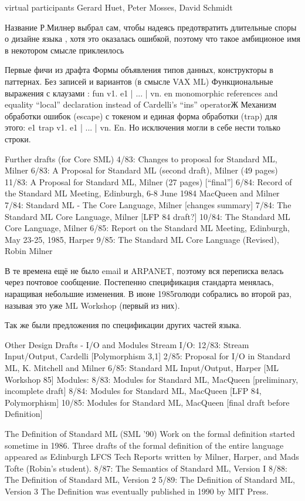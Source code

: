 \documentclass[14pt]{matmex-diploma-custom}
\begin{document}
virtual participants
Gerard Huet, Peter Mosses, David Schmidt

Название Р.Милнер выбрал сам, чтобы надеясь предотвратить длительные споры о дизайне языка , хотя это оказалась ошибкой, поэтому что такое амбиционое имя в некотором смысле приклеилось

Первые фичи из драфта
Формы объявления типов данных, конструкторы в паттернах.
Без записей и вариантов (в смысле VAX ML)
Функциональные выражения с клаузами :  fun v1. e1 | ... | vn. en
monomorphic references and equality
“local” declaration instead of Cardelli’s “ins” operatorЖ
Механизм обработки ошибок (escape) с токеном и единая форма обработки (trap) для этого:
e1 trap v1. e1 | ... | vn. En. Но исключения могли в себе нести только строки.


Further drafts (for Core SML)
4/83: Changes to proposal for Standard ML, Milner
6/83: A Proposal for Standard ML (second draft), Milner (49 pages)
11/83: A Proposal for Standard ML, Milner (27 pages) [“final”]
6/84: Record of the Standard ML Meeting, Edinburgh, 6-8 June 1984
MacQueen and Milner
7/84: Standard ML - The Core Language, Milner [changes summary]
7/84: The Standard ML Core Language, Milner [LFP 84 draft?]
10/84: The Standard ML Core Language, Milner
6/85: Report on the Standard ML Meeting, Edinburgh, May 23-25, 1985, Harper
9/85: The Standard ML Core Language (Revised), Robin Milner

В те времена ещё не было email и ARPANET, поэтому вся переписка велась через почтовое сообщение. Постепенно спецификация стандарта менялась, наращивая небольшие изменения. В июне 1985голюди собрались во второй раз, называя это уже ML Workshop (первый из них).

Так же были предложения по спецификации  других частей языка.

Other Design Drafts - I/O and Modules
Stream I/O:
12/83: Stream Input/Output, Cardelli [Polymorphism 3,1]
2/85: Proposal for I/O in Standard ML, K. Mitchell and Milner
6/85: Standard ML Input/Output, Harper [ML Workshop 85]
Modules:
8/83: Modules for Standard ML, MacQueen [preliminary, incomplete draft]
8/84: Modules for Standard ML, MacQueen [LFP 84, Polymorphism]
10/85: Modules for Standard ML, MacQueen [final draft before Definition]




The Definition of Standard ML (SML ’90)
Work on the formal definition started sometime in 1986. Three drafts of
the formal definition of the entire language appeared as Edinburgh LFCS
Tech Reports written by Milner, Harper, and Mads Tofte (Robin’s student).
8/87: The Semantics of Standard ML, Version I
8/88: The Definition of Standard ML, Version 2
5/89: The Definition of Standard ML, Version 3
The Definition was eventually published in 1990 by MIT Press.
\end{document}
